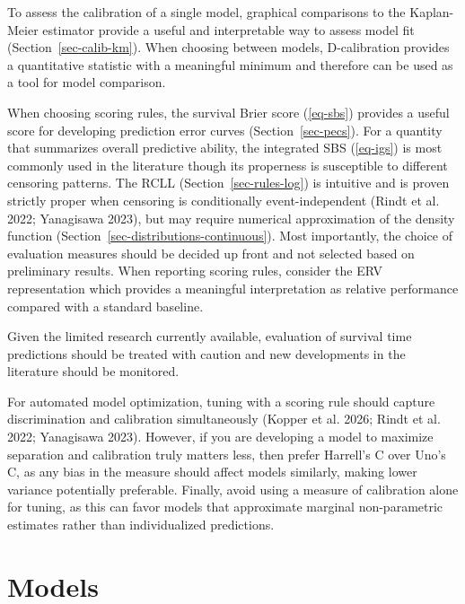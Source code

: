 \documentclass[
  letterpaper,
  krantz2]{style/krantz}
\begin{document}
To assess the calibration of a single model, graphical comparisons to
the Kaplan-Meier estimator provide a
useful and interpretable way to assess model fit
(Section~\ref{sec-calib-km}).  When choosing
between models, D-calibration provides
a quantitative statistic with a meaningful minimum and therefore can be
used as a tool for model comparison.

When choosing scoring rules, the survival Brier score (\ref{eq-sbs})
provides a useful score for developing prediction error curves
(Section~\ref{sec-pecs}). For a quantity that summarizes overall
predictive ability, the integrated SBS (\ref{eq-igs}) is most commonly
used in the literature though its properness is susceptible to different
censoring patterns. The RCLL
(Section~\ref{sec-rules-log}) is intuitive and is proven strictly proper
when censoring is conditionally event-independent (Rindt et al. 2022;
Yanagisawa 2023), but may require numerical approximation of the density
function (Section~\ref{sec-distributions-continuous}). Most importantly,
the choice of evaluation measures should be decided up front and not
selected based on preliminary results. When reporting scoring rules,
consider the ERV representation which provides a meaningful
interpretation as relative performance compared with a standard
baseline.

Given the limited research currently available, evaluation of survival
time predictions should be treated with caution and new developments in
the literature should be monitored.

For automated model optimization,
tuning with a scoring rule should capture discrimination and calibration
simultaneously (Kopper et al. 2026; Rindt et al. 2022; Yanagisawa 2023).
However, if you are developing a model to maximize separation and
calibration truly matters less, then prefer Harrell's C over Uno's C, as
any bias in the measure should affect models similarly, making lower
variance potentially preferable. Finally, avoid using a measure of
calibration alone for tuning, as this can favor models that approximate
marginal non-parametric estimates rather than individualized
predictions.

\part{Models}
\end{document}
